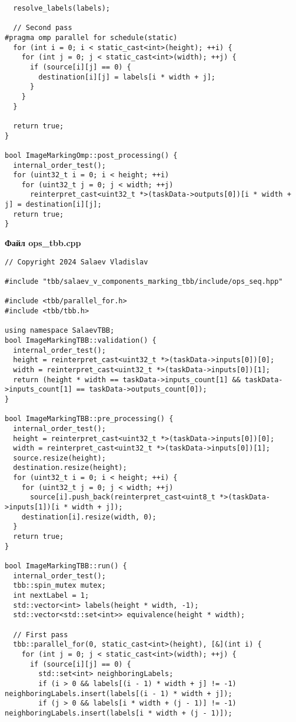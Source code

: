 \documentclass[a4paper, 14pt]{article}
\begin{document}
\begin{verbatim}
  resolve_labels(labels);

  // Second pass
#pragma omp parallel for schedule(static)
  for (int i = 0; i < static_cast<int>(height); ++i) {
    for (int j = 0; j < static_cast<int>(width); ++j) {
      if (source[i][j] == 0) {
        destination[i][j] = labels[i * width + j];
      }
    }
  }

  return true;
}

bool ImageMarkingOmp::post_processing() {
  internal_order_test();
  for (uint32_t i = 0; i < height; ++i)
    for (uint32_t j = 0; j < width; ++j)
      reinterpret_cast<uint32_t *>(taskData->outputs[0])[i * width + j] = destination[i][j];
  return true;
}
	\end{verbatim}

	\textbf{Файл ops\_tbb.cpp}
	\begin{verbatim}
// Copyright 2024 Salaev Vladislav

#include "tbb/salaev_v_components_marking_tbb/include/ops_seq.hpp"

#include <tbb/parallel_for.h>
#include <tbb/tbb.h>

using namespace SalaevTBB;
bool ImageMarkingTBB::validation() {
  internal_order_test();
  height = reinterpret_cast<uint32_t *>(taskData->inputs[0])[0];
  width = reinterpret_cast<uint32_t *>(taskData->inputs[0])[1];
  return (height * width == taskData->inputs_count[1] && taskData->inputs_count[1] == taskData->outputs_count[0]);
}

bool ImageMarkingTBB::pre_processing() {
  internal_order_test();
  height = reinterpret_cast<uint32_t *>(taskData->inputs[0])[0];
  width = reinterpret_cast<uint32_t *>(taskData->inputs[0])[1];
  source.resize(height);
  destination.resize(height);
  for (uint32_t i = 0; i < height; ++i) {
    for (uint32_t j = 0; j < width; ++j)
      source[i].push_back(reinterpret_cast<uint8_t *>(taskData->inputs[1])[i * width + j]);
    destination[i].resize(width, 0);
  }
  return true;
}

bool ImageMarkingTBB::run() {
  internal_order_test();
  tbb::spin_mutex mutex;
  int nextLabel = 1;
  std::vector<int> labels(height * width, -1);
  std::vector<std::set<int>> equivalence(height * width);

  // First pass
  tbb::parallel_for(0, static_cast<int>(height), [&](int i) {
    for (int j = 0; j < static_cast<int>(width); ++j) {
      if (source[i][j] == 0) {
        std::set<int> neighboringLabels;
        if (i > 0 && labels[(i - 1) * width + j] != -1) neighboringLabels.insert(labels[(i - 1) * width + j]);
        if (j > 0 && labels[i * width + (j - 1)] != -1) neighboringLabels.insert(labels[i * width + (j - 1)]);


\end{verbatim}
\end{document}
